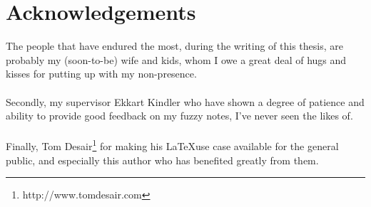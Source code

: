 \chapter{Acknowledgements}
The people that have endured the most, during the writing of this thesis, are probably my (soon-to-be) wife and kids, whom I owe a great deal of hugs and kisses for putting up with my non-presence.\\\\
Secondly, my supervisor Ekkart Kindler who have shown a degree of patience and ability to provide good feedback on my fuzzy notes, I've never seen the likes of.\\\\
Finally, Tom Desair\footnote{http://www.tomdesair.com} for making his \LaTeX use case available for the general public, and especially this author who has benefited greatly from them.
